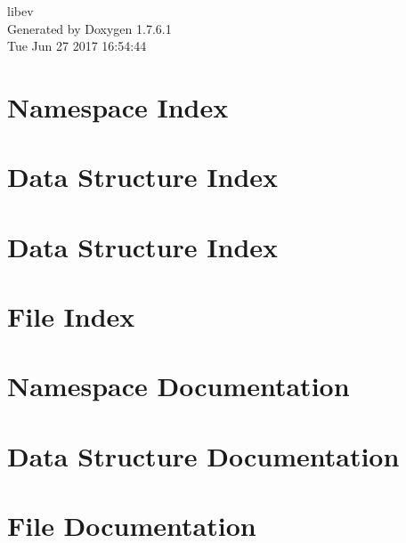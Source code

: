 \documentclass[a4paper]{book}
\begin{document}
\hypersetup{pageanchor=false,citecolor=blue}
\begin{titlepage}
\vspace*{7cm}
\begin{center}
{\Large libev }\\
\vspace*{1cm}
{\large \-Generated by Doxygen 1.7.6.1}\\
\vspace*{0.5cm}
{\small Tue Jun 27 2017 16:54:44}\\
\end{center}
\end{titlepage}
\clearemptydoublepage
{}
\tableofcontents
\clearemptydoublepage
{}
\hypersetup{pageanchor=true,citecolor=blue}
\chapter{\-Namespace \-Index}

\chapter{\-Data \-Structure \-Index}

\chapter{\-Data \-Structure \-Index}

\chapter{\-File \-Index}

\chapter{\-Namespace \-Documentation}

\chapter{\-Data \-Structure \-Documentation}































\chapter{\-File \-Documentation}















\printindex
\end{document}

